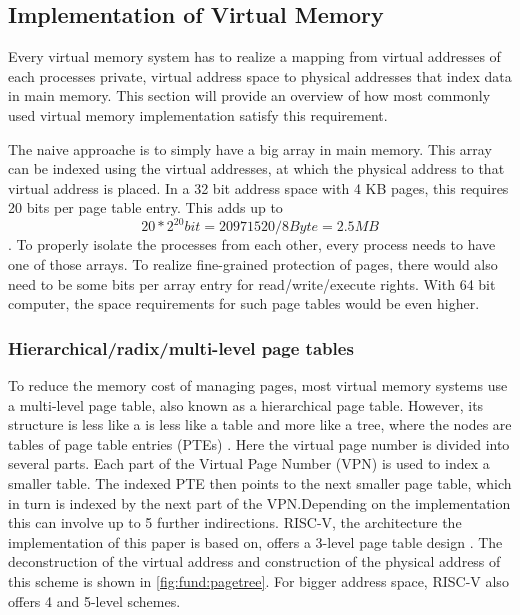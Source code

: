 \subsection{Implementation of Virtual Memory}
Every virtual memory system has to realize a mapping from virtual addresses of each processes
private, virtual address space to physical addresses that index data in main memory.
This section will provide an overview of how most commonly used virtual memory implementation satisfy
this requirement.


The naive approache is to simply have a big array in main memory. This array can be indexed
using the virtual addresses, at which the physical address to that virtual address is placed.
In a 32 bit address space with 4 KB pages, this requires 20 bits per page table entry. This
adds up to \[ 20 * 2^{20} bit = 20971520 / 8 Byte = 2.5 MB \].
To properly isolate the processes from each other, every process needs to have one of those arrays.
To realize fine-grained protection of pages, there would also need to be some bits per array entry
for read/write/execute rights.
With 64 bit computer, the space requirements for such page tables would be even higher.

\subsubsection{Hierarchical/radix/multi-level page tables}
To reduce the memory cost of managing pages, most  virtual memory systems use a
multi-level page table, also known as a hierarchical page table. However, its structure is less like a
is less like a table and more like a tree, where the nodes are tables of page table entries (PTEs) \cite{tanenbaumOS}.
Here the virtual page number is divided into several parts. Each part of the Virtual Page Number (VPN)
is used to index a smaller table. The indexed PTE then points to the next smaller page table,
which in turn is indexed by the next part of the VPN.Depending on the implementation
this can involve up to 5 further indirections.
RISC-V, the architecture the implementation of this paper is based on, offers a 3-level page table
design \cite{riscvreader}.
The deconstruction of the virtual address and construction of the physical address of this
scheme is shown in \ref{fig:fund:pagetree}.
For bigger address space, RISC-V also offers 4 and 5-level schemes.

